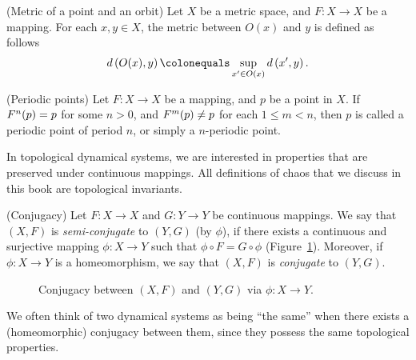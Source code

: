 \documentclass[10pt,twoside,draft]{book}
\begin{document}
\begin{definition}
  (Metric of a point and an orbit)
  Let $X$ be a metric space, and $F: X \to X$ be a mapping.
  For each $x,y \in X$, the metric between $O(x)$ and $y$ is defined as follows
  \begin{equation*}
    \metric{O(x),y} \ceq \sup\limits_{x' \in O(x)} \metric{x',y}.
  \end{equation*}
\end{definition}
\begin{definition}
  (Periodic points)
  Let $F: X \to X$ be a mapping, and $p$ be a point in $X$.
  If $F^{n}(p) = p$ for some $n > 0$, and $F^{m}(p) \neq p$ for each $1 \leq m < n$, then $p$ is called a periodic point of period $n$, or simply a $n$-periodic point.
  \label{def:porbit}
\end{definition}

In topological dynamical systems, we are interested in properties that are preserved under continuous mappings.
All definitions of chaos that we discuss in this book are topological invariants.
\begin{definition}
  (Conjugacy)
  Let $F: X \to X$ and $G: Y \to Y$ be continuous mappings.
  We say that $(X,F)$ is \textit{semi-conjugate} to $(Y,G)$ (by $\phi$), if there exists a continuous and surjective mapping $\phi: X \to Y$ such that $\phi\circ F = G\circ\phi$ (Figure~\ref{fig:conj}).
  Moreover, if $\phi: X \to Y$ is a homeomorphism, we say that $(X,F)$ is \textit{conjugate} to $(Y,G)$.
\end{definition}
\begin{figure}[ht]
  \centering
  \caption{Conjugacy between $(X,F)$ and $(Y,G)$ via $\phi: X \to Y$.}
  \label{fig:conj}
\end{figure}
We often think of two dynamical systems as being ``the same'' when there exists a (homeomorphic) conjugacy between them, since they possess the same topological properties.




\printindex
\end{document}
